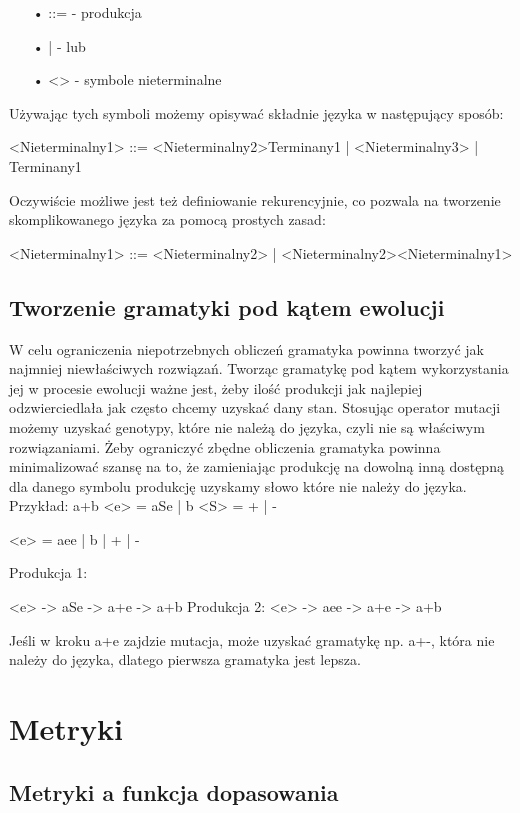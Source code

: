 \begin{itemize}
  \item[•] ::= - produkcja
  \item[•] |   - lub
  \item[•] <>  - symbole nieterminalne
\end{itemize}

Używając tych symboli możemy opisywać składnie języka w następujący sposób:

 <Nieterminalny1> ::= <Nieterminalny2>Terminany1 | <Nieterminalny3> | Terminany1
 
Oczywiście możliwe jest też definiowanie rekurencyjnie, co pozwala na tworzenie skomplikowanego języka za pomocą prostych zasad: 

	 <Nieterminalny1> ::= <Nieterminalny2> | <Nieterminalny2><Nieterminalny1>

\subsection{Tworzenie gramatyki pod kątem ewolucji}

W celu ograniczenia niepotrzebnych obliczeń gramatyka powinna tworzyć jak najmniej niewłaściwych rozwiązań. 
Tworząc gramatykę pod kątem wykorzystania jej w procesie ewolucji ważne jest, żeby ilość produkcji jak najlepiej odzwierciedlała jak często chcemy uzyskać dany stan.
Stosując operator mutacji możemy uzyskać genotypy, które nie należą do języka, czyli nie są właściwym rozwiązaniami. Żeby ograniczyć zbędne obliczenia gramatyka powinna minimalizować szansę na to, że zamieniając produkcję na dowolną inną dostępną dla danego symbolu produkcję uzyskamy słowo które nie należy do języka.
Przykład:
a+b
<e> = aSe | b
<S> = + | -

<e> = aee | b | + | -

Produkcja 1:

<e> -> aSe -> a+e -> a+b
Produkcja 2:
<e> -> aee -> a+e -> a+b

Jeśli w kroku a+e zajdzie mutacja, może uzyskać gramatykę np. a+-, która nie należy do języka, dlatego pierwsza gramatyka jest lepsza.



\section{Metryki}
\label{sec:metryki}

\subsection{Metryki a funkcja dopasowania}


